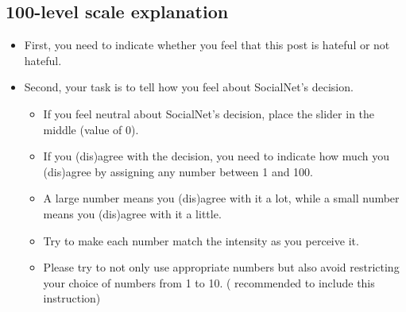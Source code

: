 \documentclass[a4paper]{article}
\begin{document}
\subsection{100-level scale explanation}
\begin{itemize}
    \item First, you need to indicate whether you feel that this post is hateful or not hateful.
    \item Second, your task is to tell how you feel about SocialNet's decision.
          \begin{itemize}
              \item If you feel neutral about SocialNet’s decision, place the slider in the middle (value of 0).
              \item If you (dis)agree with the decision, you need to indicate how much you (dis)agree by assigning any number between 1 and 100.
              \item A large number means you (dis)agree with it a lot, while a small number means you (dis)agree with it a little.
              \item Try to make each number match the intensity as you perceive it.
              \item Please try to not only use appropriate numbers but also avoid restricting your choice of numbers from 1 to 10. (\cite{bard1996magnitude} recommended to include this instruction)
          \end{itemize}
\end{itemize}
\end{document}
